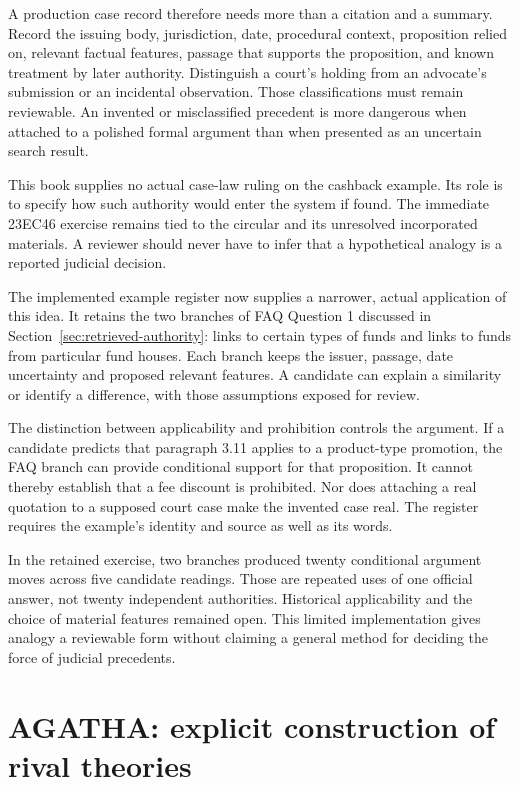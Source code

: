 A production case record therefore needs more than a citation and a summary.
Record the issuing body, jurisdiction, date, procedural context, proposition
relied on, relevant factual features, passage that supports the proposition, and
known treatment by later authority. Distinguish a court's holding from an
advocate's submission or an incidental observation. Those classifications must
remain reviewable. An invented or misclassified precedent is more dangerous when
attached to a polished formal argument than when presented as an uncertain search
result.

This book supplies no actual case-law ruling on the cashback example. Its role is
to specify how such authority would enter the system if found. The immediate
23EC46 exercise remains tied to the circular and its unresolved incorporated
materials. A reviewer should never have to infer that a hypothetical analogy is
a reported judicial decision.

The implemented example register now supplies a narrower, actual application of
this idea. It retains the two branches of FAQ Question 1 discussed in
Section~\ref{sec:retrieved-authority}: links to certain types of funds and links
to funds from particular fund houses. Each branch keeps the issuer, passage,
date uncertainty and proposed relevant features. A candidate can explain a
similarity or identify a difference, with those assumptions exposed for review.

The distinction between applicability and prohibition controls the argument.
If a candidate predicts that paragraph 3.11 applies to a product-type promotion,
the FAQ branch can provide conditional support for that proposition. It cannot
thereby establish that a fee discount is prohibited. Nor does attaching a real
quotation to a supposed court case make the invented case real. The register
requires the example's identity and source as well as its words.

In the retained exercise, two branches produced twenty conditional argument
moves across five candidate readings. Those are repeated uses of one official
answer, not twenty independent authorities. Historical applicability and the
choice of material features remained open. This limited implementation gives
analogy a reviewable form without claiming a general method for deciding the
force of judicial precedents.


\section{AGATHA: explicit construction of rival theories}
\label{merge:M05:03}


